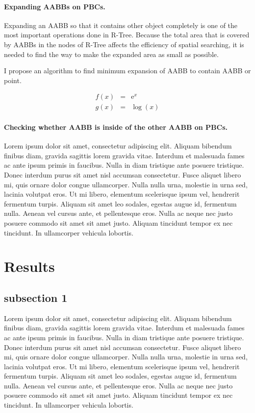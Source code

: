 \documentclass[10pt,letterpaper,twocolumn]{article}
\begin{document}

\paragraph{Expanding AABBs on PBCs.}
Expanding an AABB so that it contains other object completely is one of the most
important operations done in R-Tree. Because the total area that is covered by
AABBs in the nodes of R-Tree affects the efficiency of spatial searching, it is
needed to find the way to make the expanded area as small as possible.

I propose an algorithm to find minimum expansion of AABB to contain AABB or point.

\begin{eqnarray}
    f(x) &=& \mathrm{e}^x \nonumber\\
    g(x) &=& \log(x)      \nonumber
\end{eqnarray}

\paragraph{Checking whether AABB is inside of the other AABB on PBCs.}
Lorem ipsum dolor sit amet, consectetur adipiscing elit. Aliquam bibendum
finibus diam, gravida sagittis lorem gravida vitae. Interdum et malesuada fames
ac ante ipsum primis in faucibus. Nulla in diam tristique ante posuere
tristique. Donec interdum purus sit amet nisl accumsan consectetur. Fusce
aliquet libero mi, quis ornare dolor congue ullamcorper. Nulla nulla urna,
molestie in urna sed, lacinia volutpat eros. Ut mi libero, elementum scelerisque
ipsum vel, hendrerit fermentum turpis. Aliquam sit amet leo sodales, egestas
augue id, fermentum nulla. Aenean vel cursus ante, et pellentesque eros. Nulla
ac neque nec justo posuere commodo sit amet sit amet justo. Aliquam tincidunt
tempor ex nec tincidunt. In ullamcorper vehicula lobortis.

\section*{Results}
\subsection*{subsection 1}
Lorem ipsum dolor sit amet, consectetur adipiscing elit. Aliquam bibendum
finibus diam, gravida sagittis lorem gravida vitae. Interdum et malesuada fames
ac ante ipsum primis in faucibus. Nulla in diam tristique ante posuere
tristique. Donec interdum purus sit amet nisl accumsan consectetur. Fusce
aliquet libero mi, quis ornare dolor congue ullamcorper. Nulla nulla urna,
molestie in urna sed, lacinia volutpat eros. Ut mi libero, elementum scelerisque
ipsum vel, hendrerit fermentum turpis. Aliquam sit amet leo sodales, egestas
augue id, fermentum nulla. Aenean vel cursus ante, et pellentesque eros. Nulla
ac neque nec justo posuere commodo sit amet sit amet justo. Aliquam tincidunt
tempor ex nec tincidunt. In ullamcorper vehicula lobortis.
\end{document}
